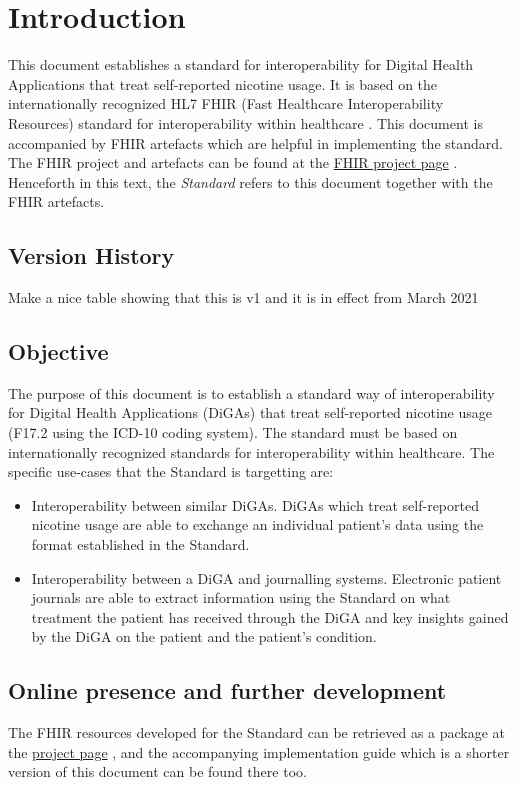 \documentclass[12px]{report}
\begin{document}
\chapter{Introduction}
\label{ch:intro}

This document establishes a standard for interoperability for Digital Health Applications that treat self-reported nicotine usage. It is based on the internationally recognized HL7\textsuperscript{\textregistered} FHIR\textsuperscript{\textregistered} (Fast Healthcare Interoperability Resources) standard for interoperability 
within healthcare \cite{FHIR}. This document is accompanied by FHIR artefacts which are helpful in implementing the standard. The FHIR project and artefacts can be found at the \href{https://simplifier.net/treat-nicotine-usage-diga}{FHIR project page} \cite{project}.
Henceforth in this text, the \textit{Standard} refers to this document together with the FHIR artefacts.

\section{Version History}
Make a nice table showing that this is v1 and it is in effect from March 2021

\section{Objective}
The purpose of this document is to establish a standard way of interoperability for Digital Health Applications (DiGAs) that treat self-reported nicotine usage (F17.2 using the ICD-10 coding system). The standard must be based on internationally recognized
standards for interoperability within healthcare. The specific use-cases that the Standard is targetting are:

\begin{itemize}
    \item Interoperability between similar DiGAs. DiGAs which treat self-reported nicotine usage are able to exchange an individual patient's data using the format established in the Standard.
    \item Interoperability between a DiGA and journalling systems. Electronic patient journals are able to extract information using the Standard on what treatment the patient has received through the DiGA and key insights gained by the DiGA on the patient and the patient's condition.
\end{itemize}

\section{Online presence and further development}
The FHIR resources developed for the Standard can be retrieved as a package at the \href{https://simplifier.net/treat-nicotine-usage-diga}{project page} \cite{project}, 
and the accompanying implementation guide which is a shorter version of this document can be found there too.
\end{document}
